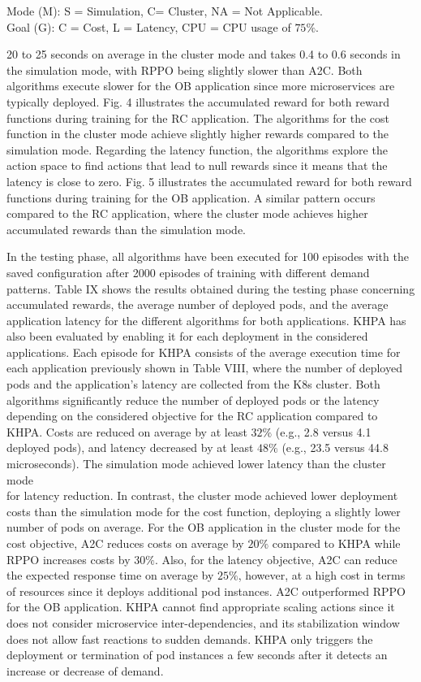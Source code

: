 \documentclass[10pt]{article}
\begin{document}
Mode (M): S = Simulation, C= Cluster, NA = Not Applicable.\\
Goal (G): C = Cost, L = Latency, CPU = CPU usage of $75 \%$.

20 to 25 seconds on average in the cluster mode and takes 0.4 to 0.6 seconds in the simulation mode, with RPPO being slightly slower than A2C. Both algorithms execute slower for the OB application since more microservices are typically deployed. Fig. 4 illustrates the accumulated reward for both reward functions during training for the RC application. The algorithms for the cost function in the cluster mode achieve slightly higher rewards compared to the simulation mode. Regarding the latency function, the algorithms explore the action space to find actions that lead to null rewards since it means that the latency is close to zero. Fig. 5 illustrates the accumulated reward for both reward functions during training for the OB application. A similar pattern occurs compared to the RC application, where the cluster mode achieves higher accumulated rewards than the simulation mode.

In the testing phase, all algorithms have been executed for 100 episodes with the saved configuration after 2000 episodes of training with different demand patterns. Table IX shows the results obtained during the testing phase concerning accumulated rewards, the average number of deployed pods, and the average application latency for the different algorithms for both applications. KHPA has also been evaluated by enabling it for each deployment in the considered applications. Each episode for KHPA consists of the average execution time for each application previously shown in Table VIII, where the number of deployed pods and the application's latency are collected from the K8s cluster. Both algorithms significantly reduce the number of deployed pods or the latency depending on the considered objective for the RC application compared to KHPA. Costs are reduced on average by at least $32 \%$ (e.g., 2.8 versus 4.1 deployed pods), and latency decreased by at least $48 \%$ (e.g., 23.5 versus 44.8 microseconds). The simulation mode achieved lower latency than the cluster mode\\
for latency reduction. In contrast, the cluster mode achieved lower deployment costs than the simulation mode for the cost function, deploying a slightly lower number of pods on average. For the OB application in the cluster mode for the cost objective, A2C reduces costs on average by $20 \%$ compared to KHPA while RPPO increases costs by $30 \%$. Also, for the latency objective, A2C can reduce the expected response time on average by $25 \%$, however, at a high cost in terms of resources since it deploys additional pod instances. A2C outperformed RPPO for the OB application. KHPA cannot find appropriate scaling actions since it does not consider microservice inter-dependencies, and its stabilization window does not allow fast reactions to sudden demands. KHPA only triggers the deployment or termination of pod instances a few seconds after it detects an increase or decrease of demand.
\end{document}
